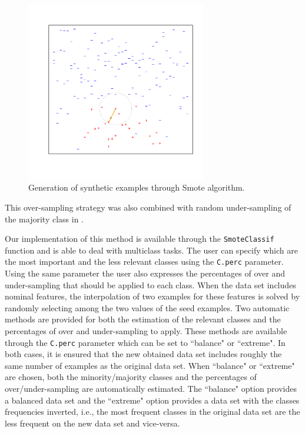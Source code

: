 \documentclass[10pt,a4paper]{article}\usepackage[]{graphicx}\usepackage[]{color}
\newenvironment{knitrout}{}{} %
\begin{document}
\begin{knitrout}\footnotesize
{}\color{fgcolor}\begin{figure}

{\centering \includegraphics[width=0.7\textwidth,height=0.4\textheight]{figures/UBL-smote_illust-1} 

}

\caption[Generation of synthetic examples through Smote algorithm]{Generation of synthetic examples through Smote algorithm.\label{smote_illust}}\label{fig:smote_illust}
\end{figure}


\end{knitrout}

This over-sampling strategy was also combined with random under-sampling of the majority class in \cite{CBOK02}. 


Our implementation of this method is available through the \texttt{SmoteClassif} function and is able to deal with multiclass tasks. The user can specify which are the most important and the less relevant classes using the \texttt{C.perc} parameter. Using the same parameter the user also expresses the percentages of over and under-sampling that should be applied to each class. When the data set includes nominal features, the interpolation of two examples for these features is solved by randomly selecting among the two values of the seed examples. Two automatic methods are provided for both the estimation of the relevant classes and the percentages of over and under-sampling to apply. These methods are available through the \texttt{C.perc} parameter which can be set to ``balance" or ``extreme". In both cases, it is ensured that the new obtained data set includes roughly the same number of examples as the original data set. When ``balance" or ``extreme" are chosen, both the minority/majority classes and the percentages of over/under-sampling are automatically estimated. The ``balance" option provides a balanced data set and the ``extreme" option provides a data set with the classes frequencies inverted, i.e., the most frequent classes in the original data set are the less frequent on the new data set and vice-versa.
\end{document}

